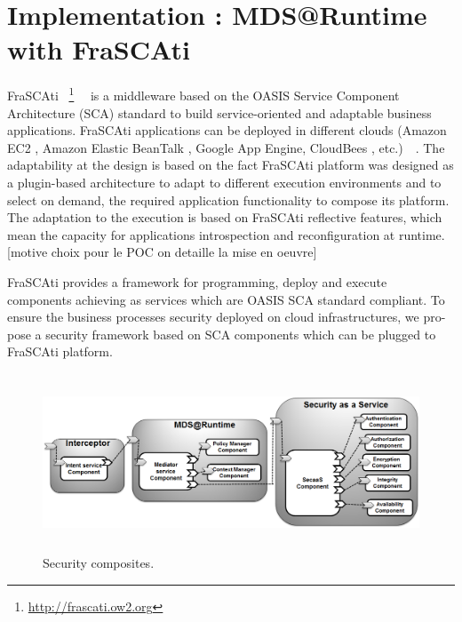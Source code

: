 \documentclass[runningheads,a4paper]{llncs}
\begin{document}
\section{Implementation : MDS@Runtime with FraSCAti}


FraSCAti ~\footnote{\url{http://frascati.ow2.org}}~\cite{SMF09}~\cite{SMR12} is a middleware based on the OASIS Service Component Architecture (SCA) standard to build service-oriented and adaptable business applications. FraSCAti applications can be deployed in different clouds (Amazon EC2 , Amazon Elastic BeanTalk , Google App Engine, CloudBees , etc.)~\cite{MRS11}~\cite{PHM12}. The adaptability at the design is based on the fact FraSCAti platform was designed as a plugin-based architecture to adapt to different execution environments and to select on demand, the required application functionality to compose its platform. The adaptation to the execution is based on FraSCAti reflective features, which mean the capacity for applications introspection and reconfiguration at runtime. [motive choix pour le POC on detaille la mise en oeuvre]

FraSCAti provides a framework for programming, deploy and execute components achieving as services which are OASIS SCA standard compliant. To ensure the business processes security deployed on cloud infrastructures, we pro- pose a security framework based on SCA components which can be plugged to FraSCAti platform. 

\begin{figure}[ht]  
\centering
\includegraphics[height=150pt, width=350pt]{composites2.png}
\caption{Security composites.}
\label{fig:compoites}
\end{figure}
\end{document}
